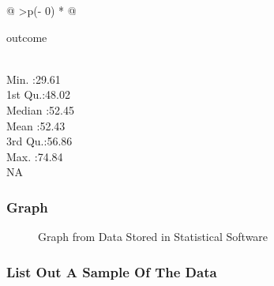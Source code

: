 \documentclass[
  letterpaper,
  DIV=11,
  numbers=noendperiod]{scrreprt}
\begin{document}
\begin{longtable}[]{@{}
  >{\centering\arraybackslash}p{(\columnwidth - 0\tabcolsep) * }@{}}
\toprule\noalign{}
\begin{minipage}[b]{\linewidth}\centering
outcome
\end{minipage} \\
\midrule\noalign{}
\endhead
\bottomrule\noalign{}
\endlastfoot
Min. :29.61 \\
1st Qu.:48.02 \\
Median :52.45 \\
Mean :52.43 \\
3rd Qu.:56.86 \\
Max. :74.84 \\
NA \\
\end{longtable}

\subsubsection{Graph}\label{graph}

\begin{figure}


\caption{\label{fig-graph-statistical}Graph from Data Stored in
Statistical Software}

\end{figure}%

\subsubsection{List Out A Sample Of The
Data}\label{list-out-a-sample-of-the-data}
\end{document}

